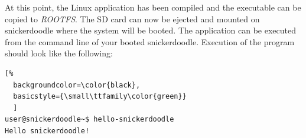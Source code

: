 \noindent
At this point, the Linux application has been compiled and the executable can be copied to \textit{ROOTFS}. The SD card can now be ejected and mounted on snickerdoodle where the system will be booted. The application can be executed from the command line of your booted snickerdoodle. Execution of the program should look like the following:

\begin{lstlisting}[%
  backgroundcolor=\color{black},
  basicstyle={\small\ttfamily\color{green}}
  ]
user@snickerdoodle~$ hello-snickerdoodle
Hello snickerdoodle!
\end{lstlisting}


